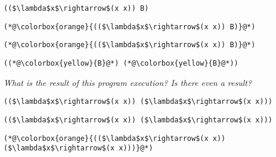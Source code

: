 \documentclass{beamer}
\begin{document}
\begin{frame}[fragile]{\CurrentSection}
\lstset{basicstyle=\ttfamily\small}\lstset{numbers=none}\lstset{language=ML}\begin{lstlisting}
(($\lambda$x$\rightarrow$(x x)) B)
\end{lstlisting}
\pause\lstset{language=ML}\begin{lstlisting}
(*@\colorbox{orange}{(($\lambda$x$\rightarrow$(x x)) B)}@*)
\end{lstlisting}

\end{frame}

\begin{frame}[fragile]{\CurrentSection}
\lstset{basicstyle=\ttfamily\small}\lstset{numbers=none}\lstset{language=ML}\begin{lstlisting}
(*@\colorbox{orange}{(($\lambda$x$\rightarrow$(x x)) B)}@*)
\end{lstlisting}
\pause\lstset{language=ML}\begin{lstlisting}
((*@\colorbox{yellow}{B}@*) (*@\colorbox{yellow}{B}@*))
\end{lstlisting}

\end{frame}

\begin{frame}[fragile]{\CurrentSection}
\begin{exampleblock}{}
\textit{What is the result of this program execution? Is there even a result?}
\end{exampleblock}

 
\lstset{basicstyle=\ttfamily\small}\lstset{numbers=none}\lstset{language=ML}\begin{lstlisting}
(($\lambda$x$\rightarrow$(x x)) ($\lambda$x$\rightarrow$(x x)))
\end{lstlisting}
 

\end{frame}

\begin{frame}[fragile]{\CurrentSection}
\lstset{basicstyle=\ttfamily\small}\lstset{numbers=none}\lstset{language=ML}\begin{lstlisting}
(($\lambda$x$\rightarrow$(x x)) ($\lambda$x$\rightarrow$(x x)))
\end{lstlisting}
\pause\lstset{language=ML}\begin{lstlisting}
(*@\colorbox{orange}{(($\lambda$x$\rightarrow$(x x)) ($\lambda$x$\rightarrow$(x x)))}@*)
\end{lstlisting}

\end{frame}
\end{document}
